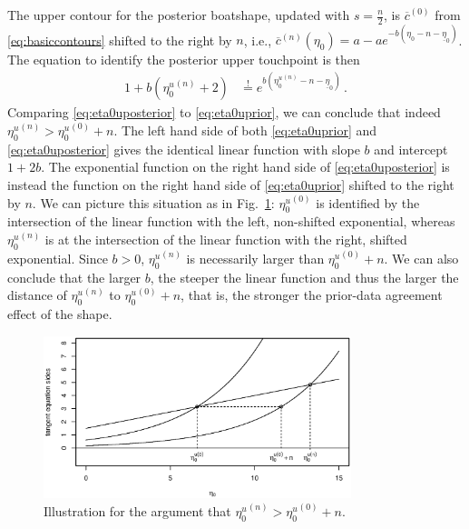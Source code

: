 \documentclass[runningheads,a4paper]{llncs}
\newcommand{\uz}{^{(0)}} %
\newcommand{\un}{^{(n)}} %
\newcommand{\ul}[1]{\underline{#1}}
\newcommand{\ol}[1]{\overline{#1}}
\def\ezl{\ul{\eta}_0}
\def\czu{\ol{c}\uz}
\def\cnu{\ol{c}\un}
\begin{document}
The upper contour for the posterior boatshape,
updated with $s = \frac{n}{2}$, %
is $\czu$ from \eqref{eq:basiccontours} shifted to the right by $n$, i.e.,
$\cnu(\eta_0) = a - a e^{-b(\eta_0 - n -\ezl)}$.
The equation to identify the posterior upper touchpoint is then
\begin{align}
1 + b({\eta_0^u}\un + 2) &\stackrel{!}{=} e^{b({\eta_0^u}\un - n - \ezl)} \,.
\label{eq:eta0uposterior}
\end{align}
Comparing \eqref{eq:eta0uposterior} to \eqref{eq:eta0uprior}, we can conclude
that indeed ${\eta_0^u}\un > {\eta_0^u}\uz + n$.
%
The left hand side of both \eqref{eq:eta0uprior} and \eqref{eq:eta0uposterior}
gives the identical linear function with slope $b$ and intercept $1+2b$. %
The exponential function on the right hand side of \eqref{eq:eta0uposterior} is instead the function 
on the right hand side of \eqref{eq:eta0uprior} shifted to the right by $n$.
We can picture this situation as in Fig.~\ref{fig:spda1}:
${\eta_0^u}\uz$ is identified by the intersection of the linear function with the left,
non-shifted exponential, %
whereas ${\eta_0^u}\un$ is at the intersection of the linear function with the right,
shifted exponential. %
Since $b > 0$, ${\eta_0^u}\un$ is necessarily larger than ${\eta_0^u}\uz + n$.
%
We can also conclude that the larger $b$, the steeper the linear function
and thus the larger the distance of ${\eta_0^u}\un$ to ${\eta_0^u}\uz + n$,
that is, the stronger the prior-data agreement effect of the shape.
\begin{figure}  %
\centering
\includegraphics[trim = 1mm 5mm 10mm 20mm, clip, width=0.8\textwidth]{R/prior-vs-posterior-eta0u.eps}%
\caption{Illustration for the argument that ${\eta_0^u}\un > {\eta_0^u}\uz + n$.}
\label{fig:spda1}
\end{figure}
\end{document}
